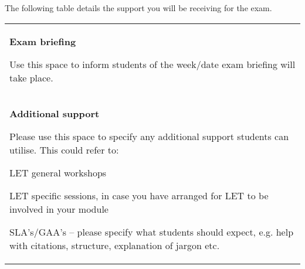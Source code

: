 \documentclass{MDXHandbook}
\begin{document}
The following table details the support you will be receiving for the exam.

\begin{tabular}{|p{.9\linewidth}|}
	\rowcolor{MDXCorporateRed}\hline
	\multicolumn{1}{|p{.9\linewidth}|}{\centering
	\textcolor{white}{\textbf{Support and Feedback sessions for Exam}}}
	\\\hline
	\textbf{Exam briefing}

	Use this space to inform students of the week/date exam briefing will take place.
	\\\hline
	\textbf{Additional support}
	
	Please use this space to specify any additional support students can utilise. This could refer to:
	
	LET general workshops
	
	LET specific sessions, in case you have arranged for LET to be involved in your module
	
	SLA’s/GAA’s – please specify what students should expect, e.g. help with citations, structure, explanation of jargon etc.
	\\\hline
\end{tabular}
\end{document}
